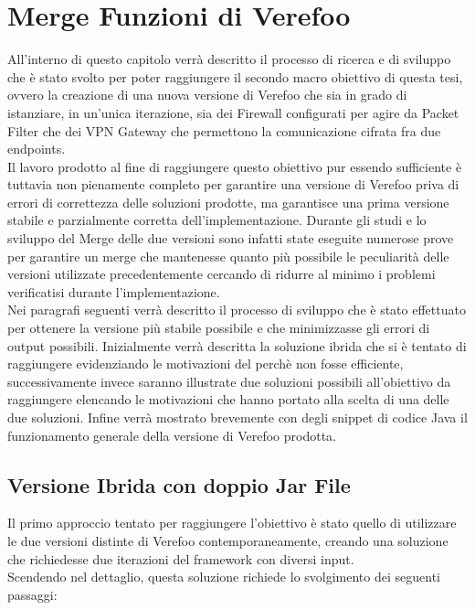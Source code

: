 \chapter{Merge Funzioni di Verefoo} \label{ch:MergeChapter}

All'interno di questo capitolo verrà descritto il processo di ricerca e di sviluppo che è stato svolto per poter raggiungere il secondo macro obiettivo di questa tesi, ovvero 
la creazione di una nuova versione di Verefoo che sia in grado di istanziare, in un'unica iterazione, sia dei Firewall configurati per agire da Packet Filter che dei VPN Gateway 
che permettono la comunicazione cifrata fra due endpoints.\\
Il lavoro prodotto al fine di raggiungere questo obiettivo pur essendo sufficiente è tuttavia non pienamente completo per garantire una versione di Verefoo priva di errori di correttezza delle soluzioni prodotte,
ma garantisce una prima versione stabile e parzialmente corretta dell'implementazione. Durante gli studi e lo sviluppo del Merge delle due versioni sono infatti state eseguite numerose prove 
per garantire un merge che mantenesse quanto più possibile le peculiarità delle versioni utilizzate precedentemente cercando di ridurre al minimo i problemi verificatisi durante l'implementazione.\\
Nei paragrafi seguenti verrà descritto il processo di sviluppo che è stato effettuato per ottenere la versione più stabile possibile e che minimizzasse gli errori di output possibili. Inizialmente 
verrà descritta la soluzione ibrida che si è tentato di raggiungere evidenziando le motivazioni del perchè non fosse efficiente, successivamente invece saranno illustrate due soluzioni possibili all'obiettivo
da raggiungere elencando le motivazioni che hanno portato alla scelta di una delle due soluzioni. Infine verrà mostrato brevemente con degli snippet di codice Java il funzionamento generale della versione di 
Verefoo prodotta. 

\newpage

\section{Versione Ibrida con doppio Jar File}
Il primo approccio tentato per raggiungere l'obiettivo è stato quello di utilizzare le due versioni distinte di Verefoo contemporaneamente, creando una soluzione che richiedesse due iterazioni del framework con diversi input.\\
Scendendo nel dettaglio, questa soluzione richiede lo svolgimento dei seguenti passaggi:

